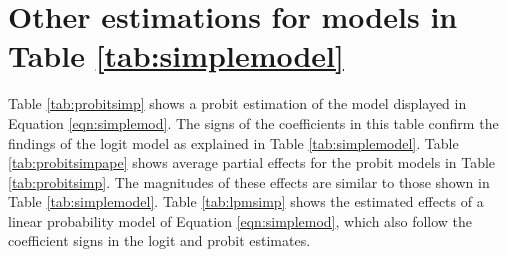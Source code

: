 \documentclass[12pt,a4]{article}\usepackage[]{graphicx}\usepackage[]{xcolor}
\begin{document}
\section{Other estimations for models in Table \ref{tab:simplemodel}}
\label{app:second}
Table \ref{tab:probitsimp} shows a probit estimation of the model displayed in Equation \ref{eqn:simplemod}. The signs of the coefficients in this table confirm the findings of the logit model as explained in Table \ref{tab:simplemodel}. Table \ref{tab:probitsimpape} shows average partial effects for the probit models in Table \ref{tab:probitsimp}. The magnitudes of these effects are similar to those shown in Table \ref{tab:simplemodel}. Table \ref{tab:lpmsimp} shows the estimated effects of a linear probability model of Equation \ref{eqn:simplemod}, which also follow the coefficient signs in the logit and probit estimates.
\end{document}
